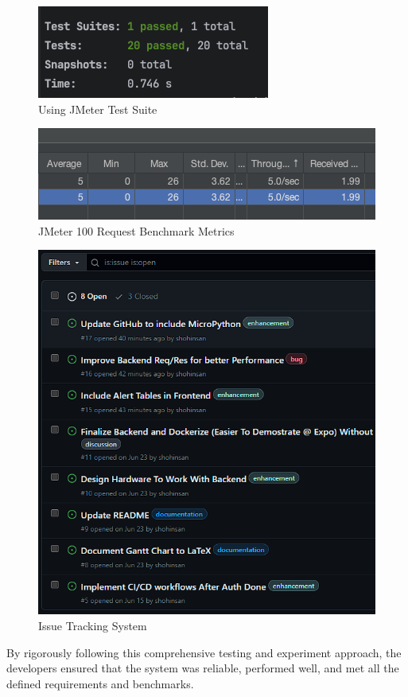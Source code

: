 \begin{figure}[htbp]
    \centering
    \includegraphics[width=1\linewidth]{datasets/images/Jest-Test-Suite.png}
    \caption{Using JMeter Test Suite}
    \label{fig:figure2}

\end{figure}

\begin{figure}[htbp]
    \centering
    \includegraphics[width=1\linewidth]{datasets/images/JMeter_100reqBenchmark.png}
    \caption{JMeter 100 Request Benchmark Metrics}
    \label{fig:figure3}
\end{figure}

\begin{figure}[htbp]
    \centering
    \includegraphics[width=1\linewidth]{datasets/images/GitHubIssues.png}
    \caption{Issue Tracking System}
    \label{fig:gitIssues}
\end{figure}

By rigorously following this comprehensive testing and experiment
approach, the developers ensured that the system was reliable,
performed well, and met all the defined requirements and benchmarks. %